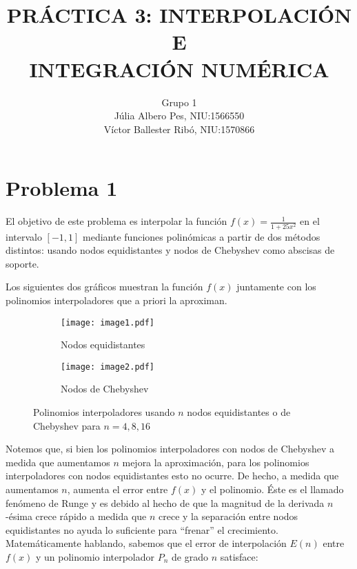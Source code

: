 \documentclass[a4paper]{article}
\title{\bfseries\Large PRÁCTICA 3: INTERPOLACIÓN E\\INTEGRACIÓN NUMÉRICA}
\author{Grupo 1\\Júlia Albero Pes, NIU:1566550\\Víctor Ballester Ribó, NIU:1570866}
\date{\parbox{\linewidth}{\centering
  Métodos numéricos\endgraf
  Grado en Matemáticas\endgraf
  Universitat Autònoma de Barcelona\endgraf
  10 de mayo de 2021}}
\begin{document}
\maketitle
\thispagestyle{empty}
\newpage
\setcounter{page}{1}
\restoregeometry
\section*{Problema 1}
El objetivo de este problema es interpolar la función $f(x)=\frac{1}{1+25x^2}$ en el intervalo $[-1,1]$ mediante funciones polinómicas a partir de dos métodos distintos: usando nodos equidistantes y nodos de Chebyshev como abscisas de soporte.\par Los siguientes dos gráficos muestran la función $f(x)$ juntamente con los polinomios interpoladores que a priori la aproximan.
\begin{figure}[ht]
    \centering
    \begin{subfigure}[b]{0.49\linewidth}
        \centering
        \texttt{[image: image1.pdf]}
        \caption{Nodos equidistantes}
    \end{subfigure}
    \hfill
    \begin{subfigure}[b]{0.49\linewidth}
        \centering
        \texttt{[image: image2.pdf]}
        \caption{Nodos de Chebyshev}
    \end{subfigure}
    \caption[Caption for LOF]{Polinomios interpoladores usando $n$ nodos equidistantes o de Chebyshev para $n=4,8,16$\footnotemark}
    \label{pro1-0}
\end{figure}\par
{}
Notemos que, si bien los polinomios interpoladores con nodos de Chebyshev a medida que aumentamos $n$ mejora la aproximación, para los polinomios interpoladores con nodos equidistantes esto no ocurre. De hecho, a medida que aumentamos $n$, aumenta el error entre $f(x)$ y el polinomio. Éste es el llamado fenómeno de Runge y es debido al hecho de que la magnitud de la derivada $n$-ésima crece rápido a medida que $n$ crece y la separación entre nodos equidistantes no ayuda lo suficiente para ``frenar'' el crecimiento. Matemáticamente hablando, sabemos que el error de interpolación $E(n)$ entre $f(x)$ y un polinomio interpolador $P_n$ de grado $n$ satisface:
\end{document}
